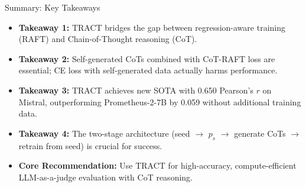 \documentclass[10pt]{beamer}
\begin{document}
	\begin{frame}{Summary: Key Takeaways}
		\begin{itemize}
			\item \textbf{Takeaway 1:} TRACT bridges the gap between regression-aware training (RAFT) and Chain-of-Thought reasoning (CoT).
			\vspace{0.2cm}
			\item \textbf{Takeaway 2:} Self-generated CoTs combined with CoT-RAFT loss are essential; CE loss with self-generated data actually harms performance.
			\vspace{0.2cm}
			\item \textbf{Takeaway 3:} TRACT achieves new SOTA with 0.650 Pearson's $r$ on Mistral, outperforming Prometheus-2-7B by 0.059 without additional training data.
			\vspace{0.2cm}
			\item \textbf{Takeaway 4:} The two-stage architecture (seed $\rightarrow$ $p_s$ $\rightarrow$ generate CoTs $\rightarrow$ retrain from seed) is crucial for success.
			\vspace{0.2cm}
			\item \textbf{Core Recommendation:} Use TRACT for high-accuracy, compute-efficient LLM-as-a-judge evaluation with CoT reasoning.
		\end{itemize}
	\end{frame}
	
\end{document}
